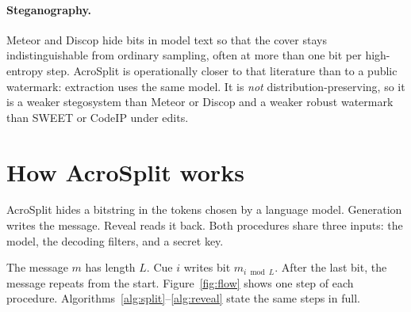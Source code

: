 \documentclass[11pt]{article}
\begin{document}
\paragraph{Steganography.}
Meteor \citep{kaptchuk2021meteor} and Discop \citep{ding2023discop} hide bits in model text so that the cover stays indistinguishable from ordinary sampling, often at more than one bit per high-entropy step.
AcroSplit is operationally closer to that literature than to a public watermark: extraction uses the same model.
It is \emph{not} distribution-preserving, so it is a weaker stegosystem than Meteor or Discop and a weaker robust watermark than SWEET or CodeIP under edits.

\section{How AcroSplit works}
\label{sec:method}

AcroSplit hides a bitstring in the tokens chosen by a language model.
Generation writes the message. Reveal reads it back.
Both procedures share three inputs: the model, the decoding filters, and a secret key.

The message $m$ has length $L$.
Cue $i$ writes bit $m_{i \bmod L}$.
After the last bit, the message repeats from the start.
Figure~\ref{fig:flow} shows one step of each procedure.
Algorithms~\ref{alg:split}--\ref{alg:reveal} state the same steps in full.
\end{document}
